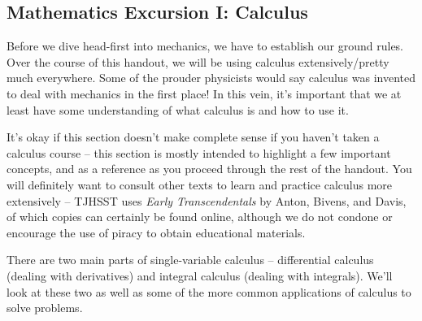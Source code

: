 \subsection{Mathematics Excursion I: Calculus}
Before we dive head-first into mechanics, we have to establish our ground rules. Over the course of this handout, we will be using calculus extensively/pretty much everywhere. Some of the prouder physicists would say calculus was invented to deal with mechanics in the first place! In this vein, it's important that we at least have some understanding of what calculus is and how to use it. 

It's okay if this section doesn't make complete sense if you haven't taken a calculus course -- this section is mostly intended to highlight a few important concepts, and as a reference as you proceed through the rest of the handout. You will definitely want to consult other texts to learn and practice calculus more extensively -- TJHSST uses \textit{Early Transcendentals} by Anton, Bivens, and Davis, of which copies can certainly be found online, although we do not condone or encourage the use of piracy to obtain educational materials. 

There are two main parts of single-variable calculus -- differential calculus (dealing with derivatives) and integral calculus (dealing with integrals). We'll look at these two as well as some of the more common applications of calculus to solve problems.
